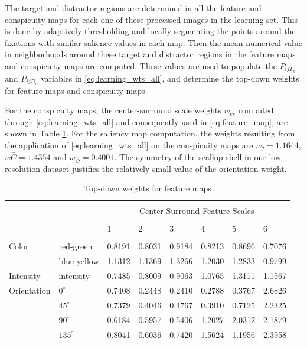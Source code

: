 \documentclass {udthesis}
\begin{document}
The target and distractor regions are determined in all the feature and conspicuity maps for each one of these processed images in the learning set.
This is done by adaptively thresholding and locally segmenting the points around the fixations with similar salience values in each map.
Then the mean numerical value in neighborhoods around  
these target and distractor regions in the feature maps and conspicuity maps 
are computed.  These values are used to populate the $P_{ijT_k}$ and $P_{ijD_r}$ variables in \eqref{eq:learning_wts_all}, and determine the top-down weights for feature maps and conspicuity maps.

For the conspicuity maps, the center-surround scale weights $w_{cs}$ computed through \eqref{eq:learning_wts_all} and consequently used in \eqref{eq:feature_map},
are shown in Table \ref{tab:tdva_fm_wts}.
For the saliency map computation, the weights resulting from the application of
\eqref{eq:learning_wts_all} on the conspicuity maps are
$w_{\bar{I}}= 1.1644$, $w{\bar{C}}= 1.4354$ and $w_{\bar{O}}= 0.4001$.  
The symmetry of the scallop shell in our low-resolution dataset 
justifies the relatively small value of the orientation weight.

\begin{table}
\caption{Top-down weights for feature maps \label{tab:tdva_fm_wts}}
\centering
\begin{tabular}{llllllll}
\toprule[1pt]\\[-6pt]
 &   & \multicolumn{6}{c}{Center Surround Feature Scales}\\[2pt]\cline{1-8}\\[-5pt]
  &   & 1 & 2 & 3 & 4 & 5 & 6\\[2pt]\cline{1-8}\\[-5pt]
Color & red-green & 0.8191 & 0.8031 & 0.9184 & 0.8213 & 0.8696 & 0.7076\\
  & blue-yellow & 1.1312 & 1.1369 & 1.3266 & 1.2030 & 1.2833 & 0.9799\\[8pt]
Intensity & intensity & 0.7485 & 0.8009 & 0.9063 & 1.0765 & 1.3111 & 1.1567\\[8pt]
Orientation & $0^\circ$ & 0.7408 & 0.2448 & 0.2410 & 0.2788 & 0.3767 & 2.6826\\
  & $45^\circ$ & 0.7379 & 0.4046 & 0.4767 & 0.3910 & 0.7125 & 2.2325\\
  & $90^\circ$ & 0.6184 & 0.5957 & 0.5406 & 1.2027 & 2.0312 & 2.1879\\
  & $135^\circ$ & 0.8041 & 0.6036 & 0.7420 & 1.5624 & 1.1956 & 2.3958\\[2pt]\bottomrule[1pt]
\end{tabular}
\end{table}
% 
\end{document}
